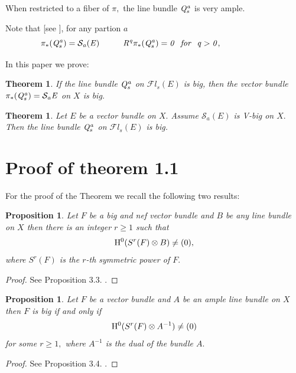 \documentclass[12pt]{amsart}
\newtheorem{thm}[subsection]{Theorem}
\newtheorem{prop}[subsection]{Proposition}
\theoremstyle{definition}
\newcommand{\SSS}{{\mathcal S}}
\numberwithin{equation}{section}
\begin{document}
When restricted to a fiber of $\pi,$ the line bundle $\it Q_s^a$ is very ample.

\bigskip


 Note that  [see \cite{Dem}], for any partion $a$ 
\begin{equation}\label{eq1} \pi_*(\it Q_{s}^a) = \SSS_{a}(E) \\
\hskip1cm R^q\pi_*(\it Q_s^a) = 0\ \ \mathit{for}\ \ q>0,\hskip2cm 
\end{equation}
\label{pi}


\smallskip

In this paper we prove:

\begin{thm}\label{main1}
	If the line bundle $\it Q_s^a$ on  $\mathcal{F}l_s(E)$ is big, 
	then  the vector bundle 
	$\pi_*(\it Q_s^a)=\SSS_{a}E$ on $X$  is big.
\end{thm} 


\begin{thm}\label{main2}
	Let $E$ be a vector bundle on $X.$ Assume $\SSS_a(E)$ is 
		V-big on $X.$ Then the line bundle $\it Q_s^a$ on  $\mathcal{F}l_s(E)$ is big.
\end{thm}




\section{Proof of theorem 1.1}

For the proof of the Theorem we recall \cite{BLNN} the following two results:

\begin{prop}\label{prop1} Let $F$ be a big and nef vector bundle and $B$ be any line bundle on $X$ then there is an integer $r \geq 1$ such that
	$$ {\rm H}^{0}(S^r(F)\otimes B)\neq (0),$$ 
	where $S^r(F)$ is the $r$-th symmetric power of $F.$
\end{prop}

\begin{proof}
	See Proposition 3.3. \cite{BLNN}.
\end{proof} 

\begin{prop}\label{prop2} Let $F$ be a vector bundle and $A$ be an ample line bundle  on $X$ then $F$ is big if and only if 
	$$ {\rm H}^{0}(S^r(F)\otimes A^{-1})\neq (0)$$ 
	for some $r \geq 1,$
	where  $A^{-1}$
	is the dual of the bundle $A.$
\end{prop}

\begin{proof} See Proposition 3.4. \cite{BLNN}.
\end{proof}
\end{document}
